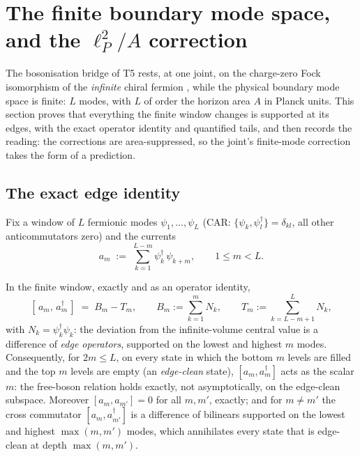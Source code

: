 \section{The finite boundary mode space, and the $\ell_P^2/A$ correction}\label{sec:seam}

The bosonisation bridge of T5 rests, at one joint, on the charge-zero Fock isomorphism of the \emph{infinite} chiral fermion \cite{FrenkelKac1980}, while the physical boundary mode space is finite: $L$ modes, with $L$ of order the horizon area $A$ in Planck units. This section proves that everything the finite window changes is supported at its edges, with the exact operator identity and quantified tails, and then records the reading: the corrections are area-suppressed, so the joint's finite-mode correction takes the form of a prediction.

\subsection{The exact edge identity}\label{subsec:edge}

Fix a window of $L$ fermionic modes $\psi_1, \dots, \psi_L$ (CAR: $\{\psi_k, \psi_l^\dagger\} = \delta_{kl}$, all other anticommutators zero) and the currents
\[
a_m \;:=\; \sum_{k=1}^{L-m} \psi_k^\dagger\,\psi_{k+m}, \qquad 1 \le m < L .
\]

\begin{proposition}\label{prop:edge}
In the finite window, exactly and as an operator identity,
\[
[\,a_m,\, a_m^\dagger\,] \;=\; B_m - T_m, \qquad
B_m := \sum_{k=1}^{m} N_k, \qquad T_m := \sum_{k=L-m+1}^{L} N_k ,
\]
with $N_k = \psi_k^\dagger\psi_k$: the deviation from the infinite-volume central value is a difference of \emph{edge operators}, supported on the lowest and highest $m$ modes. Consequently, for $2m \le L$, on every state in which the bottom $m$ levels are filled and the top $m$ levels are empty (an \emph{edge-clean} state), $[a_m, a_m^\dagger]$ acts as the scalar $m$: the free-boson relation holds exactly, not asymptotically, on the edge-clean subspace. Moreover $[a_m, a_{m'}] = 0$ for all $m, m'$, exactly; and for $m \neq m'$ the cross commutator $[a_m, a_{m'}^\dagger]$ is a difference of bilinears supported on the lowest and highest $\max(m, m')$ modes, which annihilates every state that is edge-clean at depth $\max(m, m')$.
\end{proposition}

